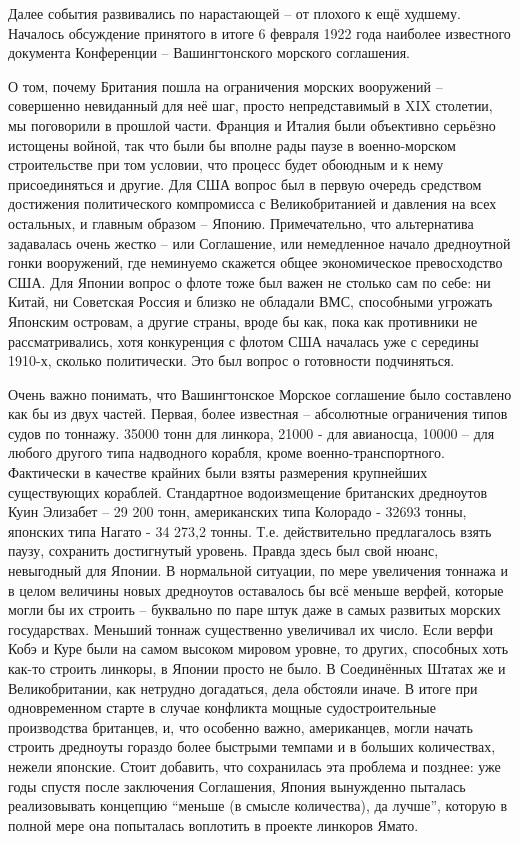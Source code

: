 Далее события развивались по нарастающей – от плохого к ещё худшему. Началось обсуждение принятого в итоге 6 февраля 1922 года наиболее известного документа Конференции – Вашингтонского морского соглашения.

О том, почему Британия пошла на ограничения морских вооружений – совершенно невиданный для неё шаг, просто непредставимый в XIX столетии, мы поговорили в прошлой части. Франция и Италия были объективно серьёзно истощены войной, так что были бы вполне рады паузе в военно-морском строительстве при том условии, что процесс будет обоюдным и к нему присоединяться и другие. Для США вопрос был в первую очередь средством достижения политического компромисса с Великобританией и давления на всех остальных, и главным образом – Японию. Примечательно, что альтернатива задавалась очень жестко – или Соглашение, или немедленное начало дредноутной гонки вооружений, где неминуемо скажется общее экономическое превосходство США. Для Японии вопрос о флоте тоже был важен не столько сам по себе: ни Китай, ни Советская Россия и близко не обладали ВМС, способными угрожать Японским островам, а другие страны, вроде бы как, пока как противники не рассматривались, хотя конкуренция с флотом США началась уже с середины 1910-х, сколько политически. Это был вопрос о готовности подчиняться.

Очень важно понимать, что Вашингтонское Морское соглашение было составлено как бы из двух частей. Первая, более известная – абсолютные ограничения типов судов по тоннажу. 35000 тонн для линкора, 21000 - для авианосца, 10000 – для любого другого типа надводного корабля, кроме военно-транспортного. Фактически в качестве крайних были взяты размерения крупнейших существующих кораблей. Стандартное водоизмещение британских дредноутов Куин Элизабет – 29 200 тонн, американских типа Колорадо - 32693 тонны, японских типа Нагато - 34 273,2 тонны. Т.е. действительно предлагалось взять паузу, сохранить достигнутый уровень. Правда здесь был свой нюанс, невыгодный для Японии. В нормальной ситуации, по мере увеличения тоннажа и в целом величины новых дредноутов оставалось бы всё меньше верфей, которые могли бы их строить – буквально по паре штук даже в самых развитых морских государствах. Меньший тоннаж существенно увеличивал их число. Если верфи Кобэ и Куре были на самом высоком мировом уровне, то других, способных хоть как-то строить линкоры, в Японии просто не было. В Соединённых Штатах же и Великобритании, как нетрудно догадаться, дела обстояли иначе. В итоге при одновременном старте в случае конфликта мощные судостроительные производства британцев, и, что особенно важно, американцев, могли начать строить дредноуты гораздо более быстрыми темпами и в больших количествах, нежели японские. Стоит добавить, что сохранилась эта проблема и позднее: уже годы спустя после заключения Соглашения, Япония вынужденно пыталась реализовывать концепцию “меньше (в смысле количества), да лучше”, которую в полной мере она попыталась воплотить в проекте линкоров Ямато.

